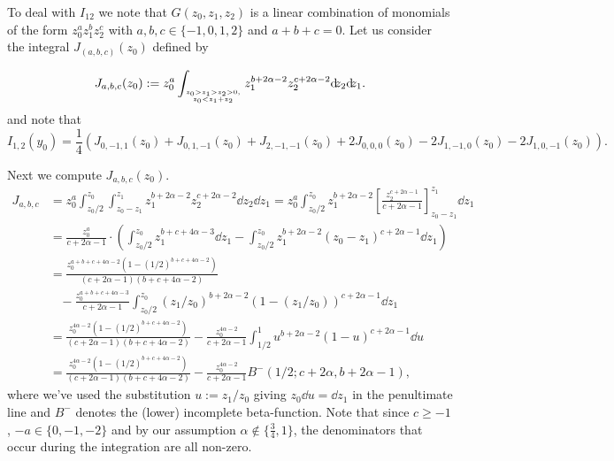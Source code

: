 To deal with $I_{12}$ we note that $G(z_0,z_1,z_2)$ is a linear combination of monomials of the form $z_0^az_1^bz_2^c$ with 
$a,b,c \in \{-1,0,1,2\}$ and $a+b+c=0$. Let us consider the integral $J_{(a,b,c)}(z_0)$ defined by 

\begin{equation}\label{eq:def_Delta_P_computation_int_J_1}
	J_{a,b,c}(z_0) := z_0^a \int_{{z_0>z_1>z_2>0,}\atop{z_0 < z_1+z_2}} z_1^{b+2\alpha-2} z_2^{c+2\alpha-2} {\operatorname{\mathrm{d}\hspace{-2pt}}}z_2{\operatorname{\mathrm{d}\hspace{-2pt}}}z_1.
\end{equation}
and note that
\begin{equation}\label{eq:Delta_P_computation_I12_with_J}
	I_{1,2}(y_0) = \frac{1}{4} (J_{0,-1,1}(z_0)+J_{0,1,-1}(z_0)+J_{2,-1,-1}(z_0)+2J_{0,0,0}(z_0)-2J_{1,-1,0}(z_0)-2J_{1,0,-1}(z_0)).
\end{equation}

Next we compute $J_{a,b,c}(z_0)$.
\begin{align*}
	J_{a,b,c} 
	&= z_0^a \int_{z_0/2}^{z_0}\int_{z_0-z_1}^{z_1} z_1^{b+2\alpha-2} z_2^{c+2\alpha-2} {\dd}z_2{\dd}z_1
		= z_0^a \int_{z_0/2}^{z_0} z_1^{b+2\alpha-2} \left[ \frac{ z_2^{c+2\alpha-1} }{ c+2\alpha-1 } \right]_{z_0-z_1}^{z_1} \dd z_1\\
	&= \frac{z_0^a}{c+2\alpha-1} \cdot \left( \int_{z_0/2}^{z_0} z_1^{b+c+4\alpha-3} \dd z_1
	   - \int_{z_0/2}^{z_0} z_1^{b+2\alpha-2} (z_0-z_1)^{c+2\alpha-1} {\dd}z_1 \right) \\
	&= \frac{z_0^{a+b+c+4\alpha-2}(1-(1/2)^{b+c+4\alpha-2})}{(c+2\alpha-1)(b+c+4\alpha-2)} \\
	&\hspace{10pt}- \frac{z_0^{a+b+c+4\alpha-3}}{c+2\alpha-1} \int_{z_0/2}^{z_0}  \left(z_1/z_0\right)^{b+2\alpha-2} 
	    \left(1-(z_1/z_0)\right)^{c+2\alpha-1} \dd z_1\\
	&= \frac{z_0^{4\alpha-2}(1-(1/2)^{b+c+4\alpha-2})}{(c+2\alpha-1)(b+c+4\alpha-2)} 
		- \frac{z_0^{4\alpha-2}}{c+2\alpha-1}
	   \int_{1/2}^1  u^{b+2\alpha-2}(1-u)^{c+2\alpha-1} \dd u \\
	&= \frac{z_0^{4\alpha-2}(1-(1/2)^{b+c+4\alpha-2})}{(c+2\alpha-1)(b+c+4\alpha-2)} 
		- \frac{z_0^{4\alpha-2}}{c+2\alpha-1} B^-(1/2;c+2\alpha, b+2\alpha-1),
\end{align*}
where we've used the substitution $u := z_1/z_0$ giving $z_0 {\dd} u = {\dd} z_1$ in the penultimate line and
$B^-$ denotes the (lower) incomplete beta-function. Note that since $c \geq -1$, $-a \in \{0,-1,-2\}$ and by our assumption $\alpha \not \in \{\frac{3}{4},1\}$, the denominators that occur during the integration are all non-zero.

